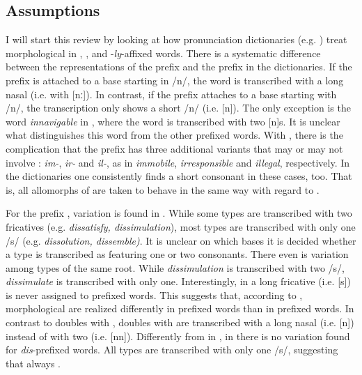 \subsection{Assumptions } \label{assumption gem English}
I will start this review by looking at how pronunciation dictionaries (e.g. \citealt{Kenyon.1953, Roach.2011, Wells.2008}) treat morphological  in , ,  and \hbox{-}\textit{ly}-affixed words.  There is a systematic difference between the representations of the prefix  and the prefix  in the dictionaries. If the prefix  is attached to a base starting in /n/, the word is transcribed with a long nasal (i.e. with [nː]). In contrast, if the prefix  attaches to a base starting with /n/, the transcription only shows a short /n/ (i.e. [n]). The only exception is the word \textit{innavigable} in \citet{Roach.2011}, where the word is transcribed with two [n]s. It is unclear what distinguishes this word from the other prefixed words. 
  With , there is the complication that the prefix has three additional variants that may or may not involve : \textit{im-}, \textit{ir-} and \textit{il-}, as in \textit{immobile}, \textit{irresponsible} and \textit{illegal}, respectively. In the dictionaries one consistently finds a short consonant in these cases, too. That is, all allomorphs of  are taken to behave in the same way with regard to .
  
 For the prefix , variation is found in \cite{Roach.2011}. While some types are transcribed with two fricatives (e.g. \textit{dissatisfy, dissimulation}), most types are transcribed with only one /s/ (e.g. \textit{dissolution, dissemble)}. It is unclear on which bases it is decided whether a type is transcribed as featuring one or two consonants. There even is variation among types of the same root. While \textit{dissimulation} is transcribed with two /s/, \textit{dissimulate} is transcribed with only one. Interestingly, in \cite{Roach.2011}  a long fricative (i.e. [s\textlengthmark]) is never assigned to prefixed words. This suggests that, according to \cite{Roach.2011}, morphological  are realized differently in prefixed words than in prefixed words. In contrast to doubles with , doubles with  are transcribed with a long nasal (i.e. [n\textlengthmark])  instead of with two (i.e. [nn]).
 Differently from in \cite{Roach.2011}, in \cite{Wells.2008} there is no variation found for \textit{dis}-prefixed words. All types are transcribed with only one /s/, suggesting that  always . 
  
